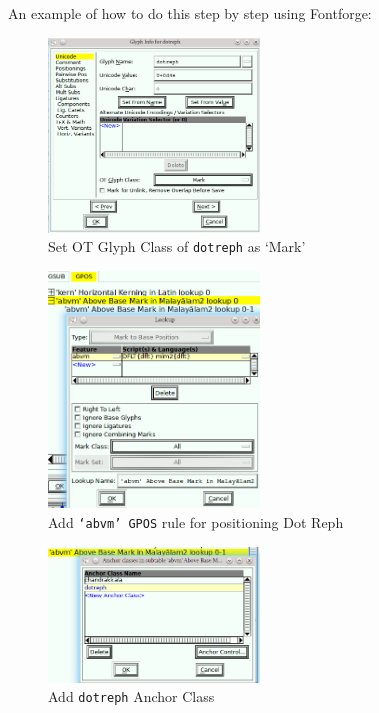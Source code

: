 An example of how to do this step by step using Fontforge:
\begin{figure}[H]	%
  \includegraphics[width=0.5\textwidth]{images/malayalam-meera-dotreph-mark.png}
  \caption{Set OT Glyph Class of \texttt{dotreph} as ‘Mark’}
\end{figure}
\begin{figure}[H]
  \includegraphics[width=0.5\textwidth]{images/malayalam-meera-gpos-abvm-1.png}
  \caption{Add \texttt{‘abvm’ GPOS} rule for positioning Dot Reph}
\end{figure}
\begin{figure}[H]
  \includegraphics[width=0.5\textwidth]{images/malayalam-meera-gpos-abvm-2.png}
  \caption{Add \texttt{dotreph} Anchor Class}
\end{figure}
